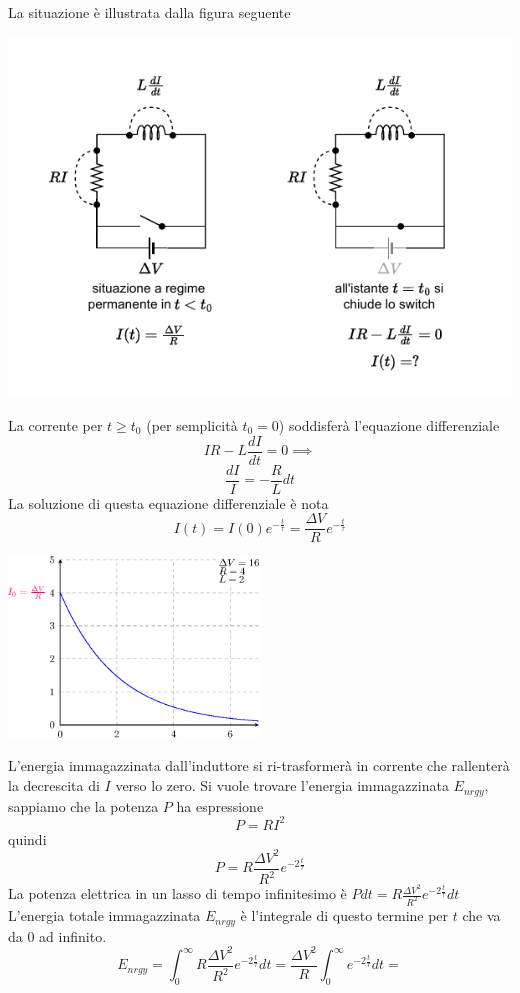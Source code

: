 \documentclass[10pt, letterpaper]{report}
\begin{document}
La situazione è illustrata dalla figura seguente\begin{center}
    \includegraphics[width=\textwidth]{images/circuitoRL2.pdf}
\end{center}
La corrente per $t\ge t_0$ (per semplicità $t_0=0$) soddisferà l'equazione differenziale 
$$ IR-L\frac{dI}{dt}=0\implies$$
$$ \frac{dI}{I}=-\frac{R}{L}dt$$
La soluzione di questa equazione differenziale è nota 
$$ I(t)=I(0)e^{-\frac{t}{\tau}}=\frac{\Delta V}{R}e^{-\frac{t}{\tau}}$$\begin{center}
    \includegraphics[width=0.5\textwidth]{images/correnteRL2.eps}
\end{center}
L'energia immagazzinata dall'induttore si ri-trasformerà in corrente che rallenterà la decrescita di $I$ verso lo zero.\acc 
Si vuole trovare l'energia immagazzinata $E_{nrgy}$, sappiamo che la potenza $P$ ha espressione 
$$ P=RI^2$$
quindi 
$$ P=R\frac{\Delta V^2}{R^2}e^{-2\frac{t}{\tau}}$$
La potenza elettrica in un lasso di tempo infinitesimo è $Pdt=R\frac{\Delta V^2}{R^2}e^{-2\frac{t}{\tau}}dt$
L'energia totale immagazzinata $E_{nrgy}$ è l'integrale di questo termine  per $t$ che va da 0 ad infinito. 
$$E_{nrgy}=\int_0^\infty R\frac{\Delta V^2}{R^2}e^{-2\frac{t}{\tau}}dt = 
\frac{\Delta V^2}{R}\int_0^\infty e^{-2\frac{t}{\tau}}dt=$$
\end{document}
